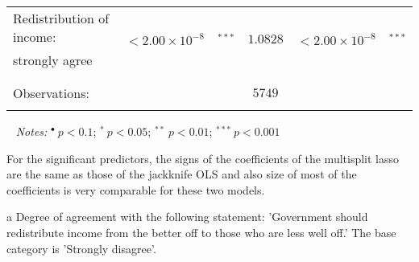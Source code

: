 \documentclass[a4paper,12pt]{article}
\begin{document}
{\begin{threeparttable}
\begin{small}
\begin{tabular}{lclrcl}
    \\
  Redistribution of income:& \multirow{2}{*}{$<2.00\times 10^{-8}$}&\multirow{2}{*}{$^{***}$}&\multirow{2}{*}{$1.0828$}&\multirow{2}{*}{$<2.00\times 10^{-8}$}&\multirow{2}{*}{$^{***}$}\\
\hspace{0.6cm}strongly agree\tnote{a}&& &&&\\%
\\
\hline
\vspace{-0.4cm} \\ Observations:&    \multicolumn{5}{c}{$5749$} \\  \vspace{-0.4cm}
\\
\hline
\end{tabular} 
\end{small}
 \begin{tablenotes}
  \begin{footnotesize}
   \item[~]\textit{Notes:} \hspace{0.2cm}$^{\bullet}~p<0.1$; $^{*}~p<0.05$; $^{**}~p<0.01$; $^{***}~p<0.001$
  \begin{adjustwidth}{1cm}{} \item For the significant predictors, the signs of the coefficients of the multisplit lasso are the same as those of the jackknife OLS and also size of most of the coefficients is very comparable for these two models.

 \item[a] Degree of agreement with the following statement: 'Government should redistribute income from the better off to those who are less well off.' The base category is 'Strongly disagree'.
     \end{adjustwidth}
 \singlespacing
  \end{footnotesize}
\end{tablenotes}
  \end{threeparttable} 
\par}
\linespread{1}

\hspace{1cm}











\end{document}
